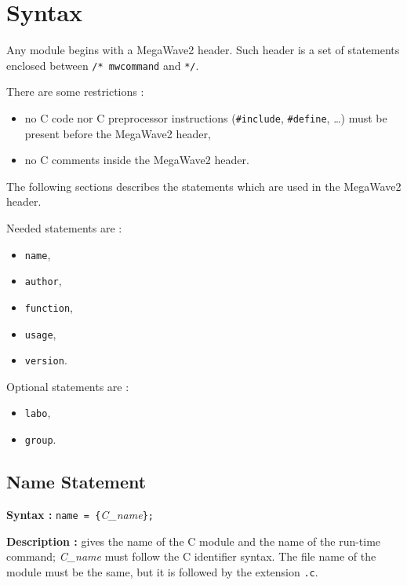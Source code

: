 %
%

\section{Syntax}
\label{header_syntax}

Any module begins with a MegaWave2 header.
Such header is a set of statements enclosed between 
\verb+/* mwcommand+ and \verb+*/+.

There are some restrictions :
\begin{itemize}
\item no C code nor C preprocessor instructions (\verb+#include+, 
\verb+#define+, \ldots) must be present before the MegaWave2 header,
\item no C comments inside the MegaWave2 header.
\end{itemize}

The following sections describes the statements which are used in 
the MegaWave2 header.

Needed statements are :
\begin{itemize}
\item \verb+name+,
\item \verb+author+,
\item \verb+function+,
\item \verb+usage+,
\item \verb+version+.

\end{itemize}

Optional statements are :
\begin{itemize}
\item \verb+labo+,
\item \verb+group+.
\end{itemize}

\subsection{Name Statement}

{\bf Syntax :} \verb+name = {+{\em C\_name}\verb+};+

{\bf Description :} gives the name of the C module and the name of the 
run-time command; {\em C\_name}  must follow the C identifier syntax.
The file name of the module must be the same, but it is followed by the extension \verb+.c+.

